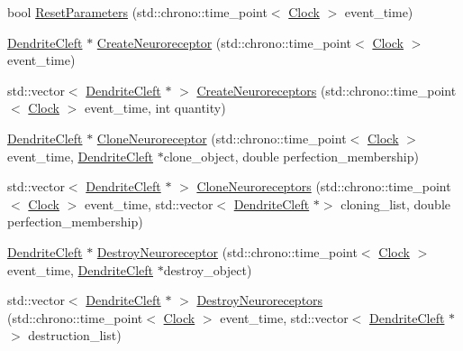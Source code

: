 \begin{DoxyCompactItemize}
\item 
bool \mbox{\hyperlink{class_dendrite_cleft_a3fee388d7023cfb460412e0322244ae2}{Reset\+Parameters}} (std\+::chrono\+::time\+\_\+point$<$ \mbox{\hyperlink{universe_8h_a0ef8d951d1ca5ab3cfaf7ab4c7a6fd80}{Clock}} $>$ event\+\_\+time)
\item 
\mbox{\hyperlink{class_dendrite_cleft}{Dendrite\+Cleft}} $\ast$ \mbox{\hyperlink{class_dendrite_cleft_ac84d3e0cafecd1436c34162f687e3851}{Create\+Neuroreceptor}} (std\+::chrono\+::time\+\_\+point$<$ \mbox{\hyperlink{universe_8h_a0ef8d951d1ca5ab3cfaf7ab4c7a6fd80}{Clock}} $>$ event\+\_\+time)
\item 
std\+::vector$<$ \mbox{\hyperlink{class_dendrite_cleft}{Dendrite\+Cleft}} $\ast$ $>$ \mbox{\hyperlink{class_dendrite_cleft_ab34af5363b25c6498aee429725a1c7db}{Create\+Neuroreceptors}} (std\+::chrono\+::time\+\_\+point$<$ \mbox{\hyperlink{universe_8h_a0ef8d951d1ca5ab3cfaf7ab4c7a6fd80}{Clock}} $>$ event\+\_\+time, int quantity)
\item 
\mbox{\hyperlink{class_dendrite_cleft}{Dendrite\+Cleft}} $\ast$ \mbox{\hyperlink{class_dendrite_cleft_a7650e1115baab30729da0b03a48da851}{Clone\+Neuroreceptor}} (std\+::chrono\+::time\+\_\+point$<$ \mbox{\hyperlink{universe_8h_a0ef8d951d1ca5ab3cfaf7ab4c7a6fd80}{Clock}} $>$ event\+\_\+time, \mbox{\hyperlink{class_dendrite_cleft}{Dendrite\+Cleft}} $\ast$clone\+\_\+object, double perfection\+\_\+membership)
\item 
std\+::vector$<$ \mbox{\hyperlink{class_dendrite_cleft}{Dendrite\+Cleft}} $\ast$ $>$ \mbox{\hyperlink{class_dendrite_cleft_a93b542418482f3732380e33346e23bd2}{Clone\+Neuroreceptors}} (std\+::chrono\+::time\+\_\+point$<$ \mbox{\hyperlink{universe_8h_a0ef8d951d1ca5ab3cfaf7ab4c7a6fd80}{Clock}} $>$ event\+\_\+time, std\+::vector$<$ \mbox{\hyperlink{class_dendrite_cleft}{Dendrite\+Cleft}} $\ast$$>$ cloning\+\_\+list, double perfection\+\_\+membership)
\item 
\mbox{\hyperlink{class_dendrite_cleft}{Dendrite\+Cleft}} $\ast$ \mbox{\hyperlink{class_dendrite_cleft_a86e9943d9d140c2a06d7e222812c9548}{Destroy\+Neuroreceptor}} (std\+::chrono\+::time\+\_\+point$<$ \mbox{\hyperlink{universe_8h_a0ef8d951d1ca5ab3cfaf7ab4c7a6fd80}{Clock}} $>$ event\+\_\+time, \mbox{\hyperlink{class_dendrite_cleft}{Dendrite\+Cleft}} $\ast$destroy\+\_\+object)
\item 
std\+::vector$<$ \mbox{\hyperlink{class_dendrite_cleft}{Dendrite\+Cleft}} $\ast$ $>$ \mbox{\hyperlink{class_dendrite_cleft_a630e00e2d1108f2a43bcac9466e4681b}{Destroy\+Neuroreceptors}} (std\+::chrono\+::time\+\_\+point$<$ \mbox{\hyperlink{universe_8h_a0ef8d951d1ca5ab3cfaf7ab4c7a6fd80}{Clock}} $>$ event\+\_\+time, std\+::vector$<$ \mbox{\hyperlink{class_dendrite_cleft}{Dendrite\+Cleft}} $\ast$$>$ destruction\+\_\+list)

\end{DoxyCompactItemize}
